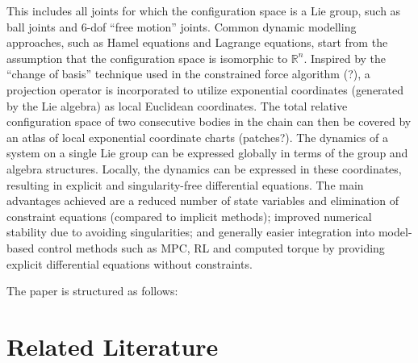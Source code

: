 \documentclass[lettersize,journal]{IEEEtran}
\def \R  {\mathbb{R}}
\begin{document}
This includes all joints for which the configuration space is a Lie group, such as ball joints and 6-dof “free
motion” joints. Common dynamic modelling approaches, such as Hamel equations and Lagrange equations, start from the assumption that the configuration space is isomorphic to $\R^n$. Inspired by the “change of basis” technique used in the constrained force algorithm \cite{}(?), a projection operator is incorporated to utilize exponential coordinates (generated by the Lie algebra) as local Euclidean coordinates. The total relative configuration space of two consecutive bodies in the chain can then be covered by an atlas of local exponential coordinate charts (patches?). The dynamics of a system on a single Lie group can be expressed globally in terms of the group and algebra structures. Locally, the dynamics can be expressed in these coordinates, resulting in explicit and
singularity-free differential equations. The main advantages achieved are a reduced number of state variables and elimination of constraint equations (compared to implicit methods); improved numerical stability due to avoiding singularities; and generally easier integration into model-based control methods such as MPC, RL and computed torque by providing explicit differential equations without constraints. 

The paper is structured as follows:


\section{Related Literature}
\label{chap:MainBackground}
\end{document}

